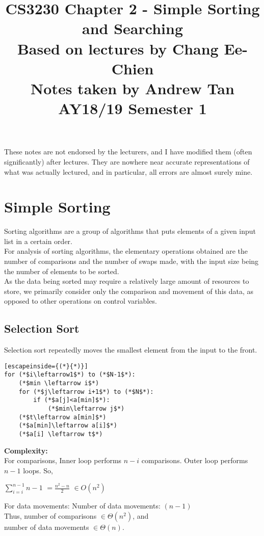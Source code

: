 \documentclass[a4paper]{article}
\title{%
	CS3230 Chapter 2 - Simple Sorting and Searching \\
	\large Based on lectures by Chang Ee-Chien
	\\ Notes taken by Andrew Tan
	\\ AY18/19 Semester 1
	\\ }
\author{}
\date{\vspace{-5ex}}
\begin{document}
\maketitle

\begin{center}\begin{minipage}[c]{0.9\textwidth}\centering\footnotesize These notes are not endorsed by the lecturers, and I have modified them (often significantly) after lectures. They are nowhere near accurate representations of what was actually lectured, and in particular, all errors are almost surely mine.\end{minipage}\end{center}

\section{Simple Sorting}
Sorting algorithms are a group of algorithms that puts elements of a given input list in a certain order.\\
For analysis of sorting algorithms, the elementary operations obtained are the number of comparisons and the number of swaps made, with the input size being the number of elements to be sorted.\\ 
As the data being sorted may require a relatively large amount of resources to store, we primarily consider only the comparison and movement of this data, as opposed to other operations on control variables.

\subsection{Selection Sort}
Selection sort repeatedly moves the smallest element from the input to the front.

\begin{lstlisting}[escapeinside={(*}{*)}]
for (*$i\leftarrow1$*) to (*$N-1$*):
	(*$min \leftarrow i$*)
	for (*$j\leftarrow i+1$*) to (*$N$*):
		if (*$a[j]<a[min]$*):
			(*$min\leftarrow j$*)
	(*$t\leftarrow a[min]$*)
	(*$a[min]\leftarrow a[i]$*)
	(*$a[i] \leftarrow t$*)
\end{lstlisting}
\textbf{Complexity:}\\
For comparisons,
Inner loop performs $n-i$ comparisons.
Outer loop performs $n-1$ loops.
So,
\begin{center}
	$\sum_{i=i}^{n-1}n-1$
	$=\frac{n^2-n}{2}$
	$\in O(n^2)$
\end{center}
For data movements:
Number of data movements: $(n-1)$\\
Thus, number of comparisons $\in \Theta(n^2)$, and\\
number of data movements $\in \Theta(n)$.
\end{document}
